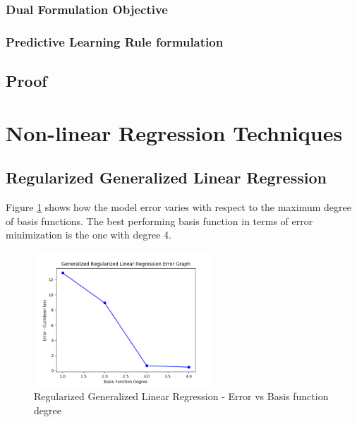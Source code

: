 \documentclass[parskip=full]{scrartcl}
\begin{document}
        \subsubsection{Dual Formulation Objective} %
        \label{ssub:dual_formulation_objective}

            
        

        \subsubsection{Predictive Learning Rule formulation} %
        \label{ssub:predictive_learning_rule_formulation}
        



    \subsection*{Proof} %
    \label{sub:proof_2}
    



\section{Non-linear Regression Techniques} %
\label{sec:non_linear_regression_techniques}

    \subsection{Regularized Generalized Linear Regression} %
    \label{sub:regularized_generalized_linear_regression}
    
        Figure \ref{fig:rglg_err_v_deg} shows how the model error varies with respect to the maximum degree of basis functions. The best performing basis function in terms of error minimization is the one with degree 4.

        \begin{figure}[ht]
            \centering
            \includegraphics[width=0.6\textwidth]{3a_degree_vs_error.png}
            \caption{Regularized Generalized Linear Regression - Error vs Basis function degree}
            \label{fig:rglg_err_v_deg}
        \end{figure}
\end{document}
